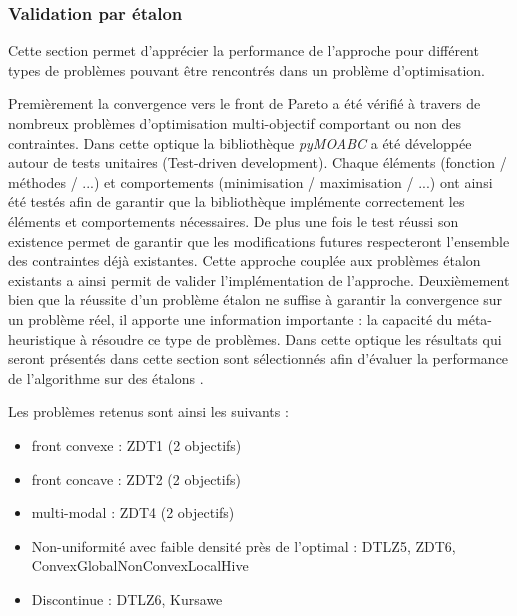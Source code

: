 \FloatBarrier


\subsubsection{Validation par étalon} %
\label{ssub:validation_par_etalon}

Cette section permet d’apprécier la performance de l’approche pour différent types
de problèmes pouvant être rencontrés dans un problème d’optimisation.


Premièrement la convergence vers le front de Pareto a été vérifié à travers de nombreux
problèmes d’optimisation multi-objectif comportant ou non des contraintes.
Dans cette optique la bibliothèque \emph{pyMOABC} a été développée autour de tests unitaires
(Test-driven development).
Chaque éléments (fonction / méthodes / ...) et comportements (minimisation / maximisation / ...)
ont ainsi été testés afin de garantir que la bibliothèque implémente correctement
les éléments et comportements nécessaires. De plus une fois le test réussi son existence
permet de garantir que les modifications futures respecteront l’ensemble des contraintes
déjà existantes.
Cette approche couplée aux problèmes étalon existants a ainsi permit de valider
l’implémentation de l’approche.
Deuxièmement bien que la réussite d’un problème étalon ne suffise à garantir la
convergence sur un problème réel, il apporte une information importante : la capacité
du méta-heuristique à résoudre ce type de problèmes. Dans cette optique les résultats
qui seront présentés dans cette section sont sélectionnés afin d’évaluer la performance
de l’algorithme sur des étalons .

Les problèmes retenus sont ainsi les suivants :
\begin{itemize}
  \item front convexe : ZDT1 (2 objectifs)
  \item front concave : ZDT2 (2 objectifs)
  \item multi-modal : ZDT4 (2 objectifs)
  \item Non-uniformité avec faible densité près de l’optimal : DTLZ5, ZDT6, ConvexGlobalNonConvexLocalHive
  \item Discontinue : DTLZ6, Kursawe
\end{itemize}


